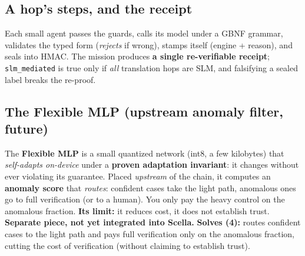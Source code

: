 \documentclass[11pt]{article}
\newcommand{\solves}[2]{{\color{efesolve}\textbf{Solves #1:} }#2\par}
\begin{document}
\subsection{A hop's steps, and the receipt}
Each small agent passes the guards, calls its model under a GBNF grammar, validates the typed form
(\emph{rejects} if wrong), stamps itself (engine + reason), and seals into HMAC. The mission produces
\textbf{a single re-verifiable receipt}; \texttt{slm\_mediated} is true only if \emph{all}
translation hops are SLM, and falsifying a sealed label breaks the re-proof.

\subsection{The Flexible MLP (upstream anomaly filter, future)}
The \textbf{Flexible MLP} is a small quantized network (int8, a few kilobytes) that \emph{self-adapts
on-device} under a \textbf{proven adaptation invariant}: it changes without ever violating its
guarantee. Placed \emph{upstream} of the chain, it computes an \textbf{anomaly score} that
\emph{routes}: confident cases take the light path, anomalous ones go to full verification (or to a
human). You only pay the heavy control on the anomalous fraction. \textbf{Its limit:} it reduces
cost, it does not establish trust. \textbf{Separate piece, not yet integrated into Scella.}
\solves{(4)}{routes confident cases to the light path and pays full verification only on the anomalous fraction, cutting the cost of verification (without claiming to establish trust).}
\end{document}
